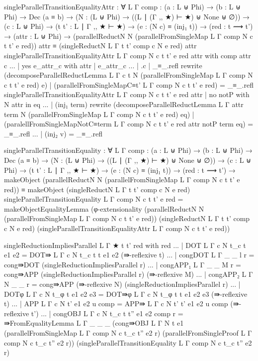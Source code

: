 {\begin{code}
  singleParallelTransitionEqualityAttr : ∀ {L Γ}
    {comp : (a : L ⊎ Phi) → (b : L ⊎ Phi) → Dec (a ≡ b)}
    → (N : (L ⊎ Phi) → ((L ∣ (Γ ,, ★) ⊢ ★) ⊎ None ⊎ ∅))
    → (c : L ⊎ Phi) 
    → (t t' : L ∣ Γ ,, ★ ⊢ ★) 
    → (e : (N c) ≡ (inj₁ t)) 
    → (red : t ⟿ t') 
    → (attr : L ⊎ Phi)
    → (parallelReductN
      N (parallelFromSingleMap {L} {Γ} {comp} N c t t' e red)) attr
      ≡ (singleReductN {L} {Γ} {t} {t'} {comp} c N e red) attr
  singleParallelTransitionEqualityAttr
    {L} {Γ} {comp} N c t t' e red attr with comp attr c
  ... | yes e_attr_c with attr | e_attr_c
  ...   | .c | _≡_.refl rewrite
    (decomposeParallelReductLemma
      {L} {Γ} {c} {t} {N}
      {(parallelFromSingleMap {L} {Γ} {comp} N c t t' e red)} e)
    | (parallelFromSingleMapC≡t' {L} {Γ} {comp} N c t t' e red) = _≡_.refl
  singleParallelTransitionEqualityAttr {L} {Γ} {comp} N c t t' e red attr
      | no notP with N attr in eq
  ...   | (inj₁ term) rewrite
    (decomposeParallelReductLemma
      {L} {Γ} {attr} {term} {N}
      {(parallelFromSingleMap {L} {Γ} {comp} N c t t' e red)} eq)
    | (paralellFromSingleMapNotC≡term
      {L} {Γ} {comp} N c t t' e red attr notP term eq) = _≡_.refl
  ...   | (inj₂ v) = _≡_.refl

  singleParallelTransitionEquality : ∀ {L Γ}
    {comp : (a : L ⊎ Phi) → (b : L ⊎ Phi) → Dec (a ≡ b)}
    → (N : (L ⊎ Phi) → ((L ∣ (Γ ,, ★) ⊢ ★) ⊎ None ⊎ ∅))
    → (c : L ⊎ Phi) 
    → (t t' : L ∣ Γ ,, ★ ⊢ ★) 
    → (e : (N c) ≡ (inj₁ t)) 
    → (red : t ⟿ t') 
    → makeObject (parallelReductN N
      (parallelFromSingleMap {L} {Γ} {comp} N c t t' e red))
      ≡ makeObject (singleReductN {L} {Γ} {t} {t'} {comp} c N e red)
  singleParallelTransitionEquality {L} {Γ} {comp} N c t t' e red =
    makeObjectEqualityLemma (φ-extensionality
      (parallelReductN N
        (parallelFromSingleMap {L} {Γ} {comp} N c t t' e red))
      (singleReductN {L} {Γ} {t} {t'} {comp} c N e red)
      (singleParallelTransitionEqualityAttr {L} {Γ} {comp} N c t t' e red))

  singleReductionImpliesParallel {L} {Γ} {★} {t} {t'} red with red
  ... | DOT {L} {Γ} {c} {N} {t_c} {t} {e1} {e2} =
    DOT⇛ {L} {Γ} {c} {N} {t_c} {t} {t} {e1} {e2} (⇛-reflexive t)
  ... | congDOT {L} {Γ} {_} {_} {l} r =
    cong⇛DOT (singleReductionImpliesParallel r)
  ... | congAPP₁ {L} {Γ} {_} {_} {M} r =
    cong⇛APP (singleReductionImpliesParallel r) (⇛-reflexive M)
  ... | congAPP₂ {L} {Γ} {N} {_} {_} r =
    cong⇛APP (⇛-reflexive N) (singleReductionImpliesParallel r)
  ... | DOTφ {L} {Γ} {c} {N} {t_φ} {t} {e1} {e2} {e3} =
    DOT⇛φ {L} {Γ} {c} {N} {t_φ} {t} {t} {e1} {e2} {e3} (⇛-reflexive t)
  ... | APP {L} {Γ} {c} {N} {t'} {e1} {e2} {u} comp =
    APP⇛ {L} {Γ} {c} {N} {t'} {t'} {e1} {e2} {u} {comp} (⇛-reflexive t')
  ... | congOBJ {L} {Γ} {c} {N} {t_c} {t} {t''} {e1} {e2} {comp} r =
    ⇛FromEqualityLemma {L} {Γ} {_} {_} {_}
      (cong⇛OBJ {L} {Γ} {N} {t} {e1}
        (parallelFromSingleMap {L} {Γ} {comp} N c t_c t'' e2 r)
        (parallelFromSingleProof {L} {Γ} {comp} N c t_c t'' e2 r))
      (singleParallelTransitionEquality {L} {Γ} {comp} N c t_c t'' e2 r)

\end{code}}         